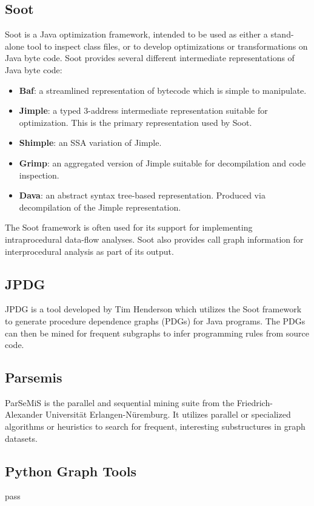 \documentclass[12pt]{article}
\begin{document}
\subsection{Soot}
Soot is a Java optimization framework, intended to be used as either a stand-alone tool to inspect class files, or to develop optimizations or transformations on Java byte code. Soot provides several different intermediate representations of Java byte code: 

\begin{itemize}
    \item\textbf{Baf}: a streamlined representation of bytecode which is simple to manipulate.
    \item\textbf{Jimple}: a typed 3-address intermediate representation suitable for optimization. This is the primary representation used by Soot.
    \item\textbf{Shimple}: an SSA variation of Jimple.
    \item\textbf{Grimp}: an aggregated version of Jimple suitable for decompilation and code inspection.
    \item\textbf{Dava}: an abstract syntax tree-based representation. Produced via decompilation of the Jimple representation.
\end{itemize}
The Soot framework is often used for its support for implementing intraprocedural data-flow analyses. Soot also provides call graph information for interprocedural analysis as part of its output. 

\subsection{JPDG}
\label{subsection:JPDG}
JPDG is a tool developed by Tim Henderson which utilizes the Soot framework to generate procedure dependence graphs (PDGs) for Java programs. The PDGs can then be mined for frequent subgraphs to infer programming rules from source code.

\subsection{Parsemis}
ParSeMiS is the parallel and sequential mining suite from the Friedrich-Alexander Universit{\"a}t Erlangen-N{\"u}remburg. It utilizes parallel or specialized algorithms or heuristics to search for frequent, interesting substructures in graph datasets.

\subsection{Python Graph Tools}
pass
\end{document}
